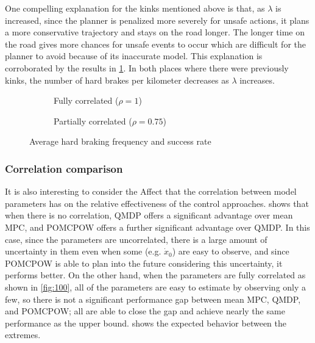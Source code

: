 One compelling explanation for the kinks mentioned above is that, as $\lambda$ is increased, since the planner is penalized more severely for unsafe actions, it plans a more conservative trajectory and stays on the road longer.
The longer time on the road gives more chances for unsafe events to occur which are difficult for the planner to avoid because of its inaccurate model.
This explanation is corroborated by the results in \cref{fig:bpkm}.
In both places where there were previously kinks, the number of hard brakes per kilometer decreases as $\lambda$ increases.

\begin{figure}[htpb]
    \centering
    \begin{subfigure}[b]{0.48\textwidth}
        \begin{center}
            
        \end{center}
        \caption{Fully correlated ($\rho=1$)}
    \end{subfigure}
    \hfill
    \begin{subfigure}[b]{0.48\textwidth}
        \begin{center}
            
        \end{center}
        \caption{Partially correlated ($\rho=0.75$)}
    \end{subfigure}
    
    \centering
    \caption{Average hard braking frequency and success rate}
    \label{fig:bpkm}
\end{figure}


\subsubsection{Correlation comparison}

It is also interesting to consider the Affect that the correlation between model parameters has on the relative effectiveness of the control approaches.
 shows that when there is no correlation, QMDP offers a significant advantage over mean MPC, and POMCPOW offers a further significant advantage over QMDP.
In this case, since the parameters are uncorrelated, there is a large amount of uncertainty in them even when some (e.g. $\dot{x}_0$) are easy to observe, and since POMCPOW is able to plan into the future considering this uncertainty, it performs better.
On the other hand, when the parameters are fully correlated as shown in \cref{fig:100}, all of the parameters are easy to estimate by observing only a few, so there is not a significant performance gap between mean MPC, QMDP, and POMCPOW; all are able to close the gap and achieve nearly the same performance as the upper bound.
 shows the expected behavior between the extremes.

